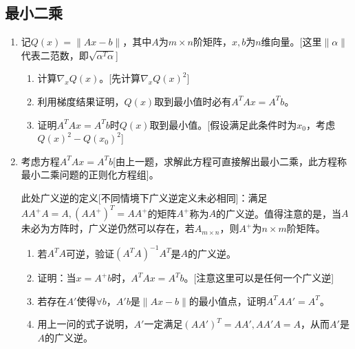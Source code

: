 \documentclass[a4paper,UTF8,fontset=windows]{ctexart}
\begin{document}
\subsection{最小二乘}
\begin{enumerate}
    \item 记$Q(x)=\|Ax-b\|$，其中$A$为$m\times n$阶矩阵，$x,b$为$n$维向量。[这里$\|\alpha\|$代表二范数，即$\sqrt{\alpha^T\alpha}$]
    \begin{enumerate}
        \item 计算$\nabla_x Q(x)$。[先计算$\nabla_x Q(x)^2$]
        \item 利用梯度结果证明，$Q(x)$取到最小值时必有$A^TAx=A^Tb$。
        \item 证明$A^TAx=A^Tb$时$Q(x)$取到最小值。[假设满足此条件时为$x_0$，考虑$Q(x)^2-Q(x_0)^2$]
    \end{enumerate}
    \item 考虑方程$A^TAx=A^Tb$[由上一题，求解此方程可直接解出最小二乘，此方程称最小二乘问题的正则化方程组]。
    
    此处广义逆的定义[不同情境下广义逆定义未必相同]：满足$AA^+A=A,(AA^+)^T=AA^+$的矩阵$A^+$称为$A$的广义逆。值得注意的是，当$A$未必为方阵时，广义逆仍然可以存在，若$A_{m\times n}$，则$A^+$为$n\times m$阶矩阵。
    \begin{enumerate}
        \item 若$A^TA$可逆，验证$(A^TA)^{-1}A^T$是$A$的广义逆。
        \item 证明：当$x=A^+b$时，$A^TAx=A^Tb$。[注意这里可以是任何一个广义逆]
        \item 若存在$A'$使得$\forall b$，$A'b$是$\|Ax-b\|$的最小值点，证明$A^TAA'=A^T$。
        \item 用上一问的式子说明，$A'$一定满足$(AA')^T=AA',AA'A=A$，从而$A'$是$A$的广义逆。
    \end{enumerate}
\end{enumerate}
\end{document}
